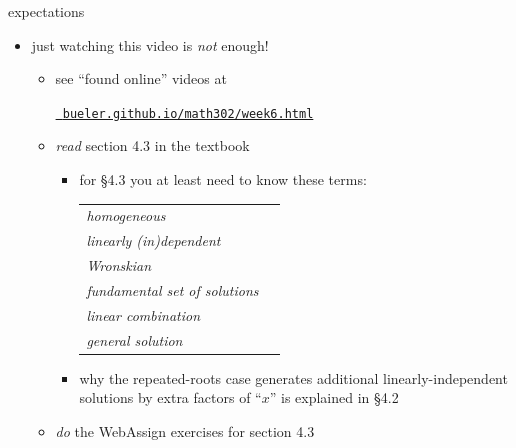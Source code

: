 \documentclass{beamer}
\begin{document}
\begin{frame}{expectations}

\begin{itemize}
\item just watching this video is \emph{not} enough!
     \begin{itemize}
     \item see ``found online'' videos at

     \centerline{\href{https://bueler.github.io/math302/week6.html}{\tt \color{cyan} bueler.github.io/math302/week6.html}}
     \item \emph{read} section 4.3 in the textbook
         \begin{itemize}
         \item for \S4.3 you at least need to know these terms:

\medskip
             \begin{tabular}{ll}
             \emph{homogeneous} \\
             \emph{linearly (in)dependent} \\
             \emph{Wronskian} \\
             \emph{fundamental set of solutions} \\
             \emph{linear combination} \\
             \emph{general solution}
             \end{tabular}

\bigskip
         \item why the repeated-roots case generates additional linearly-independent solutions by extra factors of ``$x$'' is explained in \S4.2
         \end{itemize}
     \item \emph{do} the WebAssign exercises for section 4.3
     \end{itemize}
\end{itemize}
\end{frame}
\end{document}
